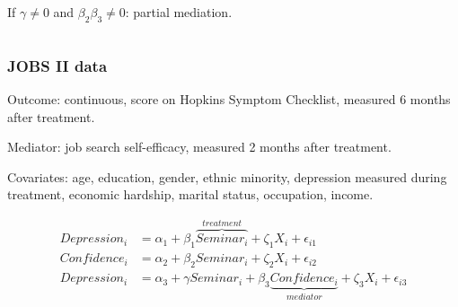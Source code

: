\documentclass[11pt,english,dvipsnames,aspectratio=169,handout]{beamer}\usepackage[]{graphicx}\usepackage[]{xcolor}
\begin{document}
\begin{frame}
\begin{columns}
\begin{column}{0.32\textwidth}
  If $\gamma \neq 0$ and $\beta_2\beta_3 \neq 0$: partial mediation.\bigskip
  
  \begin{figure}
	\end{figure}
  \end{column}
  
  \end{columns}
  
\end{frame}


\begin{frame}
  \frametitle{JOBS II data}
  Outcome: continuous, score on Hopkins Symptom Checklist, measured 6 months after treatment.\bigskip
  
  Mediator: job search self-efficacy, measured 2 months after treatment.\bigskip
  \pause
  
  Covariates: age, education, gender, ethnic minority, depression measured during treatment, economic hardship, marital status, occupation, income.
  \pause
  

  
 \footnotesize
   \begin{align}
   Depression_i &= \alpha_1 + \beta_1\overbrace{Seminar_i}^{treatment} + \zeta_1X_i + \epsilon_{i1} \\
   Confidence_i &= \alpha_2 + \beta_2Seminar_i + \zeta_2X_i + \epsilon_{i2}\\
   Depression_i &= \alpha_3 + \gamma Seminar_i + \beta_3\underbrace{Confidence_i}_{mediator} + \zeta_3X_i + \epsilon_{i3}
   \end{align}
  
\end{frame}
\end{document}
